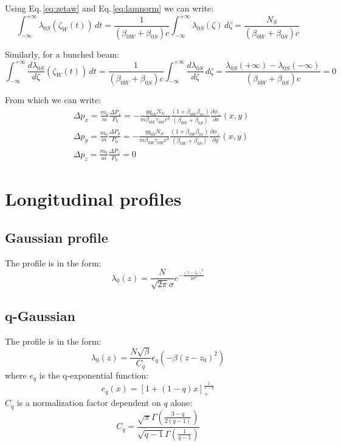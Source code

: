 Using Eq.\,\eqref{eq:zetaw} and Eq.\,\eqref{eq:lamnorm} we can write:
\begin{equation}
\int_{-\infty}^{+\infty}\lambda_{0S}(\zeta_W(t)) \,dt 
=\frac{1}{(\beta_{0W}+\beta_{0S})c}\int_{-\infty}^{+\infty}\lambda_{0S}(\zeta) \,d\zeta = \frac{N_S}{(\beta_{0W}+\beta_{0S})c}
\end{equation}

Similarly, for a bunched beam:
\begin{equation}
\int_{-\infty}^{+\infty}
\frac{d \lambda_{0S}}{d \zeta}(\zeta_W(t)) \,dt 
=\frac{1}{(\beta_{0W}+\beta_{0S})c}\int_{-\infty}^{+\infty}\frac{d \lambda_{0S}}{d \zeta} \,d\zeta = \frac{ \lambda_{0S}(+\infty)-\lambda_{0S}(-\infty)}{(\beta_{0W}+\beta_{0S})c} = 0
\end{equation}

From which we can write:
\begin{align}
&\boxed{
\Delta p_x = \frac{m_0}{m}\frac{\Delta P_x} {P_0}= -\frac{qq_{0S} N_S 
}{m\beta_{0W}\gamma_{0W}c^2}
\frac{(1+\beta_{0W}  \beta_{0s})}{(\beta_{0W}+\beta_{0S})}
\frac{\partial \phi_\perp}{\partial x}(x, y )}\\
&\boxed{
\Delta p_y = \frac{m_0}{m}\frac{\Delta P_y} {P_0}= -\frac{qq_{0S} N_S 
}{m\beta_{0W}\gamma_{0W}c^2}
\frac{(1+\beta_{0W}  \beta_{0s})}{(\beta_{0W}+\beta_{0S})}
\frac{\partial \phi_\perp}{\partial y}(x, y )}\\
&\boxed{
\Delta p_z = \frac{m_0}{m}\frac{\Delta P_z} {P_0}=0}
\end{align}

\section{Longitudinal profiles}

\subsection{Gaussian profile}

The profile is in the form:
\begin{equation}
\lambda_{0}(z)=\frac{N}{\sqrt{2 \pi} \sigma} e^{-\frac{(z-z_0)^{2}}{2 \sigma^{2}}}
\end{equation}


\subsection{q-Gaussian}

The profile is in the form:
\begin{equation}
\lambda_0(z)=\frac{N\sqrt{\beta}}{C_{q}} e_{q}\left(-\beta (z-z_0)^{2}\right)
\end{equation}
where $e_q$ is the q-exponential function:
\begin{equation}
e_{q}(x)=[1+(1-q) x]_{+}^{\frac{1}{1-q}}
\end{equation}
$C_q$ is a normalization factor dependent on $q$ alone:
\begin{equation}
C_{q}=\frac{\sqrt{\pi} \Gamma\left(\frac{3-q}{2(q-1)}\right)}{\sqrt{q-1} \Gamma\left(\frac{1}{q-1}\right)}
\end{equation}

